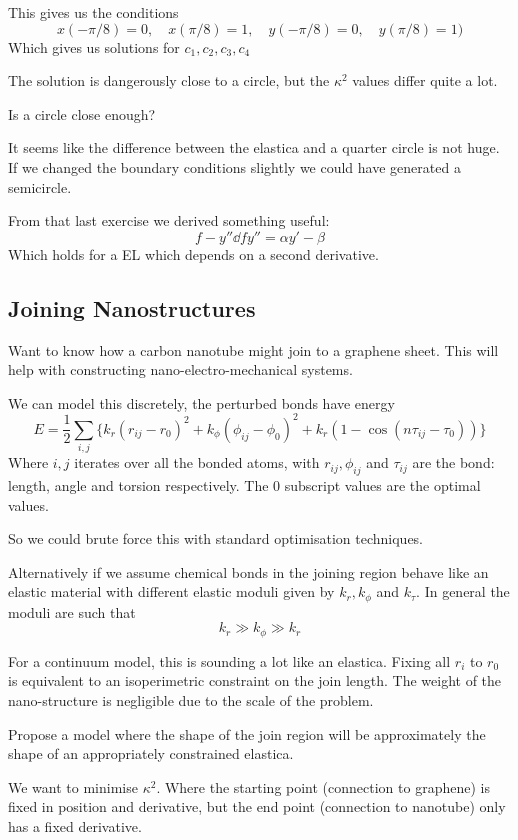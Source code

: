 \documentclass{E:/Documents/Latex/myassignment}
\begin{document}
This gives us the conditions
\[x(-\pi/8) = 0, \quad x(\pi/8) = 1, \quad y(-\pi/8) = 0 ,\quad y(\pi/8) = 1)\]
Which gives us solutions for $c_1,c_2,c_3,c_4$

The solution is dangerously close to a circle, but the $\kappa^2$ values differ quite a lot. 

Is a circle close enough?

It seems like the difference between the elastica and a quarter circle is not huge. If we changed the boundary conditions slightly we could have generated a semicircle.


From that last exercise we derived something useful:
\[f - y'' \dd f{y''} = \alpha y' - \beta\]
Which holds for a EL which depends on a second derivative.


\subsection{Joining Nanostructures}
Want to know how a carbon nanotube might join to a graphene sheet. This will help with constructing nano-electro-mechanical systems.

We can model this discretely, the perturbed bonds have energy
\[E = \frac12 \sum_{i,j} \{k_r (r_{ij} - r_0)^2 + k_\phi (\phi_{ij} - \phi_0)^2 + k_r (1 - \cos(n \tau_{ij} - \tau_0))\}\]
Where $i,j$ iterates over all the bonded atoms, with $r_{ij}, \phi_{ij}$ and $\tau_{ij}$ are the bond: length, angle and torsion respectively. The $0$ subscript values are the optimal values.


So we could brute force this with standard optimisation techniques.

Alternatively if we assume chemical bonds in the joining region behave like an elastic material with different elastic moduli given by $k_r, k_\phi$ and $k_\tau$. In general the moduli are such that
\[k_r \gg k_\phi \gg k_r\]

For a continuum model, this is sounding a lot like an elastica. Fixing all $r_i$ to $r_0$ is equivalent to an isoperimetric constraint on the join length. The weight of the nano-structure is negligible due to the scale of the problem. 

Propose a model where the shape of the join region will be approximately the shape of an appropriately constrained elastica.

We want to minimise $\kappa^2$. Where the starting point (connection to graphene) is fixed in position and derivative, but the end point (connection to nanotube) only has a fixed derivative.
\end{document}

